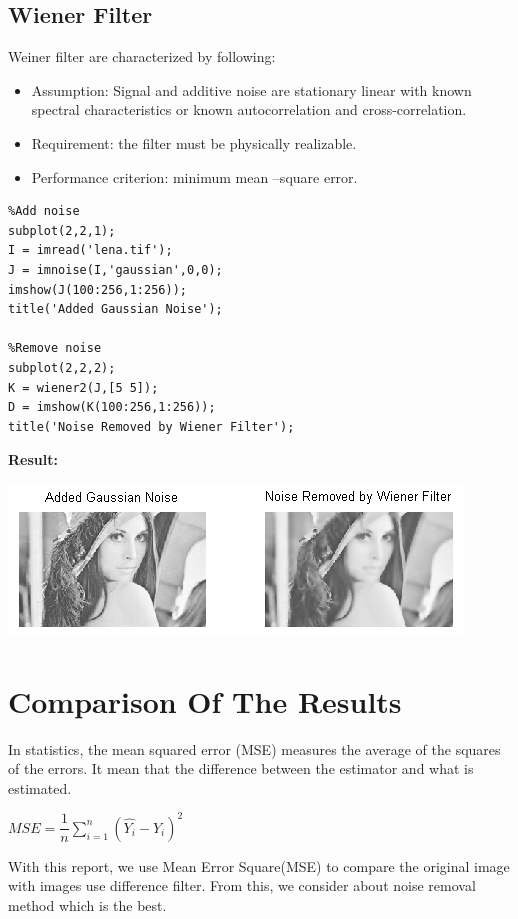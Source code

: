 \documentclass[10pt]{article}
\begin{document}
\subsection{Wiener Filter}

Weiner filter are characterized by following:
\begin{itemize}
	\item Assumption: Signal and additive noise are stationary linear with known spectral characteristics or known autocorrelation and cross-correlation.
	\item Requirement: the filter must be physically realizable.
	\item Performance criterion: minimum mean –square error. 
\end{itemize} 

\begin{lstlisting}
%Add noise
subplot(2,2,1);
I = imread('lena.tif');
J = imnoise(I,'gaussian',0,0);
imshow(J(100:256,1:256));
title('Added Gaussian Noise');

%Remove noise
subplot(2,2,2);
K = wiener2(J,[5 5]);
D = imshow(K(100:256,1:256));
title('Noise Removed by Wiener Filter');
\end{lstlisting} 

\textbf{Result:}

\includegraphics{Wiener.png}

\section{ Comparison Of The Results }
In statistics, the mean squared error (MSE) measures the average of the squares of the errors. It mean that the difference between the estimator and what is estimated.
\begin{center}
$MSE =  \dfrac{1}{n} \displaystyle \sum_{i=1}^{n}(\hat{Y_i} - Y_i)^2$
	
\end{center}


With this report, we use Mean Error Square(MSE) to compare the original image with images use difference filter. From this, we consider about noise removal method which is the best.
\end{document}

